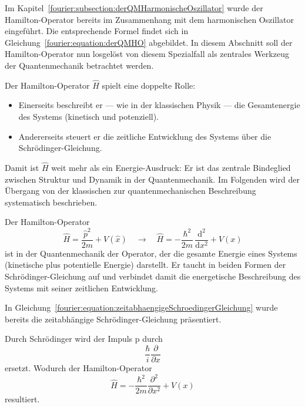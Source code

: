 		Im Kapitel~\ref{fourier:subsection:derQMHarmonischeOszillator} wurde der Hamilton-Operator bereits im Zusammenhang mit dem harmonischen Oszillator eingeführt.
		Die entsprechende Formel findet sich in Gleichung~\ref{fourier:equation:derQMHO} abgebildet.
		In diesem Abschnitt soll der Hamilton-Operator nun losgelöst von diesem Spezialfall als zentrales Werkzeug der Quantenmechanik betrachtet werden.
		
		Der Hamilton-Operator \( \hat{H} \) spielt eine doppelte Rolle:
		\begin{itemize}
		\item Einerseits beschreibt er — wie in der klassischen Physik — die Gesamtenergie des Systems (kinetisch und potenziell).
		\item Andererseits steuert er die zeitliche Entwicklung des Systems über die Schrödinger-Gleichung.
		\end{itemize}

		Damit ist \( \hat{H} \) weit mehr als ein Energie-Ausdruck: Er ist das zentrale Bindeglied zwischen Struktur und Dynamik in der Quantenmechanik. Im Folgenden wird der Übergang von der klassischen zur quantenmechanischen Beschreibung systematisch beschrieben.



	Der Hamilton-Operator
	\begin{equation}\label{fourier:equation:hamiltonOperator}
		\hat{H} = \frac{\hat p^2}{2m} + V(\hat{x})
		\quad\longrightarrow\quad
		\hat{H} = -\frac{\hbar^2}{2m}\,\frac{\mathrm{d}^2}{\mathrm{d}x^2} + V(x)
	\end{equation}
	ist in der Quantenmechanik der Operator, der die gesamte Energie eines Systems (kinetische plus potentielle Energie) darstellt.
	Er taucht in beiden Formen der Schrödinger-Gleichung auf und verbindet damit die energetische Beschreibung des Systems mit seiner zeitlichen Entwicklung.

	In Gleichung~\ref{fourier:equation:zeitabhaengigeSchroedingerGleichung} wurde bereits die zeitabhängige Schrödinger-Gleichung präsentiert. %


	Durch Schrödinger wird der Impuls p durch
	\begin{equation}
		\frac{\hbar}{i} \frac{\partial}{\partial x}
	\end{equation}
	ersetzt.
	Wodurch der Hamilton-Operator
	\begin{equation}
		\hat{H} = -\frac{\hbar^2}{2m}\frac{\partial^2}{\partial x^2} + V(x)
	\end{equation}	
	resultiert.

